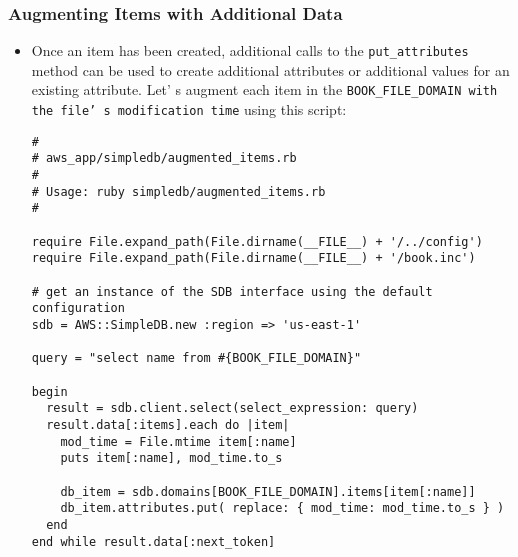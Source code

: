\documentclass{beamer}
\begin{document}
\begin{frame}
\frametitle{Augmenting Items with Additional Data}
\begin{itemize}
\item Once an item has been created, additional calls to the \texttt{put\_attributes} method can
be used to create additional attributes or additional values for an existing attribute.
Let’ s augment each item in the \texttt{BOOK\_FILE\_DOMAIN with the file’ s modification time}
using this script:

\lstset{language=Ruby, style=eclipse}
\begin{lstlisting}
#
# aws_app/simpledb/augmented_items.rb
#
# Usage: ruby simpledb/augmented_items.rb
#

require File.expand_path(File.dirname(__FILE__) + '/../config')
require File.expand_path(File.dirname(__FILE__) + '/book.inc')

# get an instance of the SDB interface using the default configuration
sdb = AWS::SimpleDB.new :region => 'us-east-1'

query = "select name from #{BOOK_FILE_DOMAIN}"

begin
  result = sdb.client.select(select_expression: query)
  result.data[:items].each do |item|
    mod_time = File.mtime item[:name]
    puts item[:name], mod_time.to_s

    db_item = sdb.domains[BOOK_FILE_DOMAIN].items[item[:name]]
    db_item.attributes.put( replace: { mod_time: mod_time.to_s } )
  end
end while result.data[:next_token]

\end{lstlisting}
\end{itemize}
\end{frame}
\end{document}
